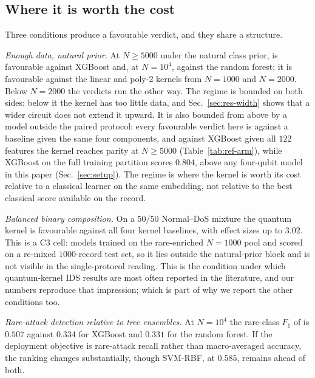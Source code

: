 \subsection{Where it is worth the cost}
\begin{revbody}

Three conditions produce a favourable verdict, and they share a structure.

\emph{Enough data, natural prior.} At $N\geq5000$ under the natural class prior,
\QSVM{} is favourable against XGBoost and, at $N=10^{4}$, against the random
forest; it is favourable against the linear and poly-2 kernels from $N=1000$ and
$N=2000$. Below $N=2000$ the verdicts run the other way. The regime is bounded
on both sides: below it the kernel has too little data, and
Sec.~\ref{sec:res-width} shows that a wider circuit does not extend it upward.
It is also bounded from above by a model outside the paired protocol: every
favourable verdict here is against a baseline given the same four components,
and against XGBoost given all $122$ features the kernel reaches parity at
$N\geq5000$ (Table~\ref{tab:ref-arm}), while XGBoost on the full training
partition scores $0.804$, above any four-qubit model in this paper
(Sec.~\ref{sec:setup}). The regime is where the kernel is worth its cost
relative to a classical learner on the same embedding, not relative to the best
classical score available on the record.

\emph{Balanced binary composition.} On a $50/50$ Normal--DoS mixture the quantum
kernel is favourable against all four kernel baselines, with effect sizes up to
$3.02$. This is a C3 cell: models trained on the rare-enriched $N=1000$ pool
and scored on a re-mixed $1000$-record test set, so it lies outside the
natural-prior block and is not visible in the single-protocol reading. This is the condition under which quantum-kernel IDS results are most
often reported in the literature, and our numbers reproduce that impression;
which is part of why we report the other conditions too.

\emph{Rare-attack detection relative to tree ensembles.} At $N=10^{4}$ the
rare-class $F_{1}$ of \QSVM{} is $0.507$ against $0.334$ for XGBoost and $0.331$
for the random forest. If the deployment objective is rare-attack recall rather
than macro-averaged accuracy, the ranking changes substantially, though
SVM-RBF, at $0.585$, remains ahead of both.
\end{revbody}

